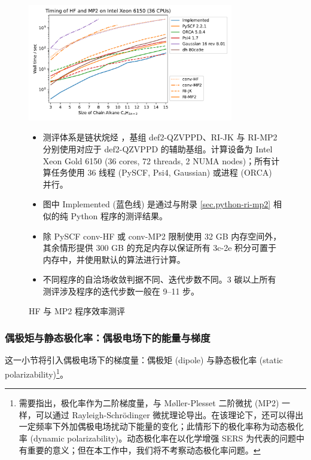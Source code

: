 \begin{figure}[b!]
  \centering
  \caption{HF 与 MP2 程序效率测评}
  \label{fig.timing-rimp2-implemented}
  \includegraphics[width=0.8\textwidth]{assets/timing-rimp2-implemented.pdf}

  \raggedright
  \begin{itemize}[nosep]
    \item 测评体系是链状烷烃 ，基组 def2-QZVPPD、RI-JK 与 RI-MP2 分别使用对应于 def2-QZVPPD 的辅助基组。计算设备为 Intel Xeon Gold 6150 (36 cores, 72 threads, 2 NUMA nodes)；所有计算任务使用 36 线程 (PySCF, Psi4, Gaussian) 或进程 (ORCA) 并行。
    \item 图中 Implemented (蓝色线) 是通过与附录 \ref{sec.python-ri-mp2} 相似的纯 Python 程序的测评结果。
    \item 除 PySCF conv-HF 或 conv-MP2 限制使用 32 GB 内存空间外，其余情形提供 300 GB 的充足内存以保证所有 3c-2e 积分可置于内存中，并使用默认的算法进行计算。
    \item 不同程序的自洽场收敛判据不同、迭代步数不同。3 碳以上所有测评涉及程序的迭代步数一般在 9--11 步。
  \end{itemize}
\end{figure}

\subsubsection{偶极矩与静态极化率：偶极电场下的能量与梯度}

这一小节将引入偶极电场下的梯度量：偶极矩 (dipole) 与静态极化率 (static polarizability)\footnote{需要指出，极化率作为二阶梯度量，与 M\o{}ller-Plesset 二阶微扰 (MP2) 一样，可以通过 Rayleigh-Schr\"odinger 微扰理论导出。在该理论下，还可以得出一定频率下外加偶极电场扰动下能量的变化；此情形下的极化率称为动态极化率 (dynamic polarizability)。动态极化率在以化学增强 SERS 为代表的问题中有重要的意义\cite{Jensen-Schatz.CSR.2008, Perez-Jimenez-Ren.CS.2020, Li-Xu.C.2022}；但在本工作中，我们将不考察动态极化率问题。}。

